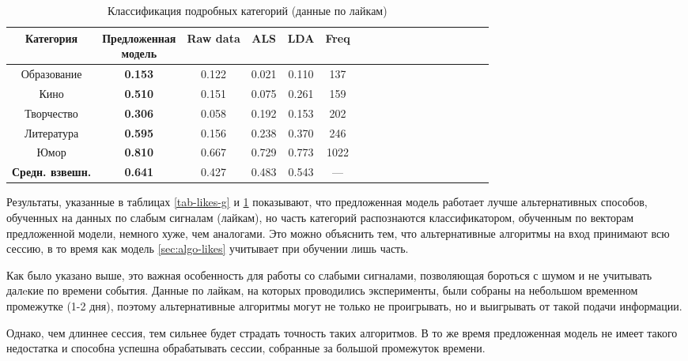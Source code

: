 \documentclass[times,specification,annotation]{itmo-student-thesis}
\begin{document}
\begin{table}[!h]
\caption{Классификация подробных категорий (данные по лайкам)}\label{tab-likes-d}
\centering
\begin{tabular}{|*{18}{c|}}\hline
Категория & \thead{Предложенная \\  модель}  & Raw data & ALS & LDA & Freq \\\hline
Образование             &  \textbf{0.153} & 0.122 & 0.021 & 0.110 & 137 \\\hline
Кино             & \textbf{0.510} & 0.151 & 0.075 &  0.261 & 159 \\\hline
Творчество            &  \textbf{0.306} & 0.058 & 0.192 & 0.153 & 202 \\\hline
Литература             & \textbf{0.595} & 0.156 & 0.238 &  0.370 & 246  \\\hline
Юмор            & \textbf{0.810} & 0.667 & 0.729 &  0.773 & 1022 \\\hline
\textbf{Средн. взвешн.}  &  \textbf{0.641} & 0.427 & 0.483 & 0.543 & --- \\\hline
\end{tabular}
\end{table}

Результаты, указанные в таблицах \ref{tab-likes-g} и \ref{tab-likes-d} показывают, что предложенная модель работает лучше альтернативных способов, обученных на данных по слабым сигналам (лайкам), но часть категорий распознаются классификатором, обученным по векторам предложенной модели, немного хуже, чем аналогами. Это можно объяснить тем, что альтернативные алгоритмы на вход принимают всю сессию, в то время как модель \ref{sec:algo-likes} учитывает при обучении лишь часть. 

Как было указано выше, это важная особенность для работы со слабыми сигналами, позволяющая бороться с шумом и не учитывать далeкие по времени события. Данные по лайкам, на которых проводились эксперименты, были собраны на небольшом временном промежутке (1-2 дня), поэтому альтернативные алгоритмы могут не только не проигрывать, но и выигрывать от такой подачи информации. 

Однако, чем длиннее сессия, тем сильнее будет страдать точность таких алгоритмов. В то же время предложенная модель не имеет такого недостатка и способна успешна обрабатывать сессии, собранные за большой промежуток времени.
\end{document}
